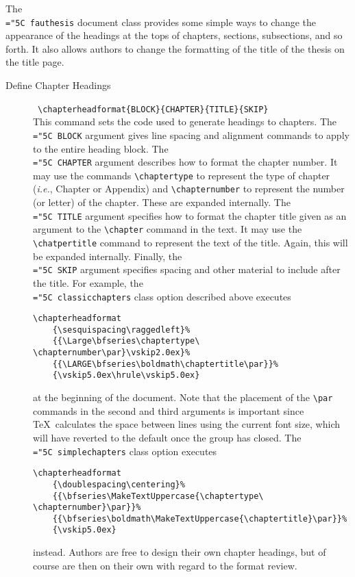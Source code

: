 \documentclass[11pt]{article}
\newcommand\code[1]{{\normalfont\texttt{\let\dv\textsl\chardef\\="5C #1}}}
\begin{document}
The \code{fauthesis} document class provides some simple ways to change the appearance of the headings at the tops of chapters, sections, subsections, and so forth.  It also allows authors to change the formatting of the title of the thesis on the title page.
%
\begin{description}

\item[Define Chapter Headings] \dotfill\ \verb=\chapterheadformat{BLOCK}{CHAPTER}{TITLE}{SKIP}=\\
This command sets the code used to generate headings to chapters.  The \code{BLOCK} argument gives line spacing and alignment commands to apply to the entire heading block.  The \code{CHAPTER} argument describes how to format the chapter number.  It may use the commands \verb=\chaptertype= to represent the type of chapter (\textit{i.e.}, Chapter or Appendix) and \verb=\chapternumber= to represent the number (or letter) of the chapter.  These are expanded internally.  The \code{TITLE} argument specifies how to format the chapter title given as an argument to the \verb=\chapter= command in the text.  It may use the \verb=\chatpertitle= command to represent the text of the title.  Again, this will be expanded internally.  Finally, the \code{SKIP} argument specifies spacing and other material to include after the title.  For example, the \code{classicchapters} class option described above executes 
%
{\small\begin{verbatim}
\chapterheadformat
	{\sesquispacing\raggedleft}%
	{{\Large\bfseries\chaptertype\ \chapternumber\par}\vskip2.0ex}%
	{{\LARGE\bfseries\boldmath\chaptertitle\par}}%
	{\vskip5.0ex\hrule\vskip5.0ex}
\end{verbatim}}
%
at the beginning of the document.  Note that the placement of the \verb=\par= commands in the second and third arguments is important since \TeX\ calculates the space between lines using the current font size, which will have reverted to the default once the group has closed.  The \code{simplechapters} class option executes 
%
{\small\begin{verbatim}
\chapterheadformat
	{\doublespacing\centering}%
	{{\bfseries\MakeTextUppercase{\chaptertype\ \chapternumber}\par}}%
	{{\bfseries\boldmath\MakeTextUppercase{\chaptertitle}\par}}%
	{\vskip5.0ex}
\end{verbatim}}
%
instead.  Authors are free to design their own chapter headings, but of course are then on their own with regard to the format review.


\end{description}
\end{document}
